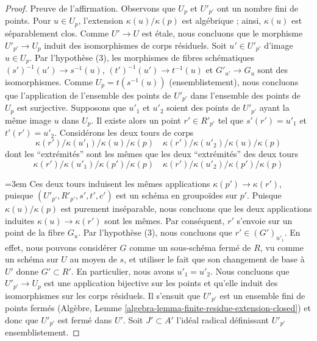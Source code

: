 \begin{proof}
\medskip\noindent
Preuve de l'affirmation. Observons que $U_p$ et $U'_{p'}$ ont un nombre fini de points.
Pour $u \in U_p$, l'extension $\kappa(u)/\kappa(p)$ est algébrique ;
ainsi, $\kappa(u)$ est séparablement clos.
Comme $U' \to U$ est \'etale, nous concluons que le morphisme $U'_{p'} \to U_p$
induit des isomorphismes de corps résiduels.
Soit $u' \in U'_{p'}$ d'image $u \in U_p$.
Par l'hypothèse (3), les morphismes de fibres schématiques
$(s')^{-1}(u') \to s^{-1}(u)$,
$(t')^{-1}(u') \to t^{-1}(u)$ et
$G'_{u'} \to G_u$ sont des isomorphismes. Comme $U_p = t(s^{-1}(u))$
(ensemblistement), nous concluons que l'application de l'ensemble des points de $U'_{p'}$
dans l'ensemble des points de $U_p$ est surjective.
Supposons que $u'_1$ et $u'_2$ soient des points de $U'_{p'}$ ayant
la même image $u$ dans $U_p$. Il existe alors un point
$r' \in R'_{p'}$ tel que $s'(r') = u'_1$ et $t'(r') = u'_2$.
Considérons les deux tours de corps
$$
\kappa(r')/\kappa(u'_1)/\kappa(u)/\kappa(p) \quad
\kappa(r')/\kappa(u'_2)/\kappa(u)/\kappa(p)
$$
dont les ``extrémités'' sont les mêmes que les deux ``extrémités'' des deux tours
$$
\kappa(r')/\kappa(u'_1)/\kappa(p')/\kappa(p) \quad
\kappa(r')/\kappa(u'_2)/\kappa(p')/\kappa(p)
$$
{\emergencystretch=3em Ces deux tours induisent les mêmes applications $\kappa(p') \to \kappa(r')$, puisque
$(U'_{p'}, R'_{p'}, s', t', c')$ est un schéma en groupoïdes sur $p'$.
Puisque $\kappa(u)/\kappa(p)$ est purement inséparable,
nous concluons que les deux applications induites
$\kappa(u) \to \kappa(r')$ sont les mêmes.
Par conséquent, $r'$ s'envoie sur un point de la fibre $G_u$.
Par l'hypothèse (3), nous concluons que $r' \in (G')_{u'_1}$.
En effet, nous pouvons considérer $G$ comme un sous-schéma fermé de $R$,
vu comme un schéma sur $U$ au moyen de $s$, et utiliser le fait que
son changement de base à $U'$ donne $G' \subset R'$.
En particulier, nous avons $u'_1 = u'_2$.
Nous concluons que $U'_{p'} \to U_p$ est une application bijective
sur les points et qu'elle induit des isomorphismes sur les corps résiduels.
Il s'ensuit que $U'_{p'}$ est un ensemble fini de points fermés
(Algèbre, Lemme \ref{algebra-lemma-finite-residue-extension-closed})
et donc que $U'_{p'}$ est fermé dans $U'$.
Soit $J' \subset A'$ l'idéal radical définissant $U'_{p'}$
ensemblistement.\par}


\end{proof}

